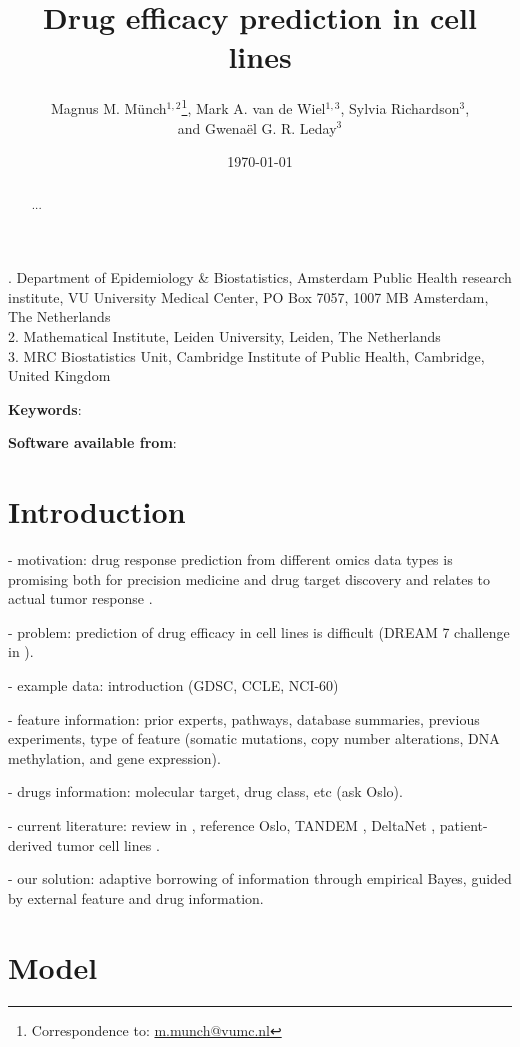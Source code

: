 \documentclass[a4paper,hidelinks]{article}\usepackage[]{graphicx}\usepackage[]{color}
\title{Drug efficacy prediction in cell lines}
\date{\today}
\author{Magnus M. M\"unch$^{1,2}$\footnote{Correspondence to: \href{mailto:m.munch@vumc.nl}{m.munch@vumc.nl}}, Mark A. van de Wiel$^{1,3}$, Sylvia Richardson$^{3}$, \\ and Gwena{\"e}l G. R. Leday$^{3}$}
\newcommand{\0}{\bm{0}}
\renewcommand{\(}{\left(}
\renewcommand{\)}{\right)}
\renewcommand{\[}{\left[}
\renewcommand{\]}{\right]}
\begin{document}
	\maketitle
	
	. Department of Epidemiology \& Biostatistics, Amsterdam Public Health research institute, VU University Medical Center, PO Box 7057, 1007 MB
	Amsterdam, The Netherlands\\
	2. Mathematical Institute, Leiden University, Leiden, The Netherlands \\
	3. MRC Biostatistics Unit, Cambridge Institute of Public Health, Cambridge, United Kingdom \\
	
	\begin{abstract}
		{...}
	\end{abstract}
	
	\noindent\textbf{Keywords}: 
	
	\noindent\textbf{Software available from}:
	
	\section{Introduction}
	- motivation: drug response prediction from different omics data types is promising both for precision medicine and drug target discovery and relates to actual tumor response \cite[]{iorio_landscape_2016}. 
		
	- problem: prediction of drug efficacy in cell lines is difficult (DREAM 7 challenge in \cite{costello_community_2014}).	

	- example data: introduction (GDSC, CCLE, NCI-60)
	
	- feature information: prior experts, pathways, database summaries, previous experiments, type of feature (somatic mutations, copy number alterations, DNA methylation, and gene expression). 
	
	- drugs information: molecular target, drug class, etc (ask Oslo).
	
	- current literature: review in \cite{azuaje_computational_2017}, reference Oslo, TANDEM \cite[]{aben_tandem:_2016}, DeltaNet \cite[]{noh_inferring_2016}, patient-derived tumor cell lines \cite[]{gao_high-throughput_2015}.
	
	- our solution: adaptive borrowing of information through empirical Bayes, guided by external feature and drug information.
	
	\section{Model}
\end{document}
